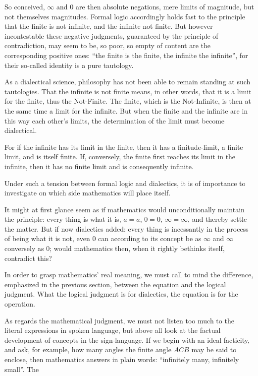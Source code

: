 \documentclass[12pt]{book}
\begin{document}
So conceived, $\infty$ and $0$ are then absolute negations, mere limits of
magnitude, but not themselves magnitudes. Formal logic accordingly holds fast to
the principle that the finite is not infinite, and the infinite not finite. But
however incontestable these negative judgments, guaranteed by the principle of
contradiction, may seem to be, so poor, so empty of content are the corresponding
positive ones: ``the finite is the finite, the infinite the infinite'', for their
so-called identity is a pure tautology.

As a dialectical science, philosophy has not been able to remain standing at such
tautologies. That the infinite is not
finite means, in other words, that it is a limit for the finite, thus the
Not-Finite. The finite, which is the Not-Infinite, is then at the same time a limit
for the infinite. But when the finite and the infinite are in this way each other's
limits, the determination of the limit must become dialectical.

For if the infinite has its limit in the finite, then it has a finitude-limit, a
finite limit, and is itself finite. If, conversely, the finite first reaches its
limit in the infinite, then it has no finite limit and is consequently infinite.

Under such a tension between formal logic and dialectics, it is of importance to
investigate on which side mathematics will place itself.

It might at first glance seem as if mathematics would unconditionally maintain the
principle: every thing is what it is, $a=a$, $0=0$, $\infty=\infty$, and thereby
settle the matter. But if now dialectics added: every thing is incessantly in the
process of being what it is not, even $0$ can according to its concept be as
$\infty$ and $\infty$ conversely as $0$; would mathematics then, when it rightly
bethinks itself, contradict this?

In order to grasp mathematics' real meaning, we must call to mind the difference,
emphasized in the previous section, between the equation and the logical judgment.
What the logical judgment is for dialectics, the equation is for the operation.

As regards the mathematical judgment, we must not listen too much to the literal
expressions in spoken language, but above all look at the factual development of
concepts in the sign-language. If we begin with an ideal facticity, and ask, for
example, how many angles the finite angle $ACB$ may be said to enclose, then
mathematics answers in plain words: ``infinitely many, infinitely small''. The
\end{document}
